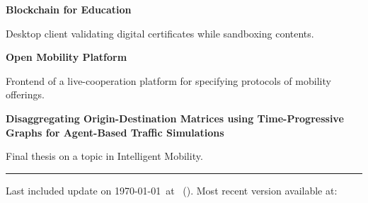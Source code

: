 \documentclass[12pt,a4paper,ragged2e,withhyper]{altacv} %
\begin{document}
\begin{paracol}{2}
\textbf{Blockchain for Education}

Desktop client validating digital certificates while sandboxing contents.

\smallskip


\medskip

\textbf{Open Mobility Platform}

Frontend of a live-cooperation platform for specifying protocols of mobility offerings.

\smallskip

 

\smallskip


\medskip



\textbf{Disaggregating Origin-Destination Matrices
using Time-Progressive Graphs for Agent-Based Traffic Simulations}

Final thesis on a topic in Intelligent Mobility.

\smallskip

   

\smallskip





\end{paracol}

\vfill
\hrule
\medskip
\small{
    Last included update on \today~at \DTMcurrenttime~(\DTMcurrentzone).
    Most recent version available at: 
}
\end{document}
